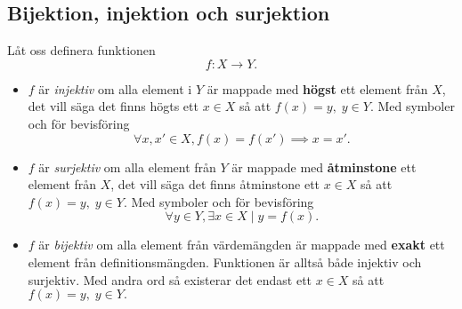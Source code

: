 \documentclass{article}
\theoremstyle{definition}
\begin{document}
\subsection{Bijektion, injektion och surjektion}
\begin{mydef}{}{}
  Låt oss definera funktionen
  \[f: X \rightarrow Y.\]
  \begin{itemize}
    \item $f$ är \textit{injektiv} om alla element i $Y$ är mappade med \textbf{högst}
    ett element från $X$, det vill säga det finns högts ett $x \in X$ så att $f(x) = y, \; y \in Y.$
    Med symboler och för bevisföring
    \[\forall x, x' \in X, f(x) = f(x') \implies x = x'.\]
    \item $f$ är \textit{surjektiv} om alla element från 
    $Y$ är mappade med \textbf{åtminstone} ett element från $X$, det 
    vill säga det finns åtminstone ett $x \in X$ så att $f(x) = y, \; y \in Y.$
    Med symboler och för bevisföring
    \[\forall y \in Y, \exists x \in X \; | \; y = f(x).\]
    \item $f$ är \textit{bijektiv} om alla element från värdemängden är mappade med \textbf{exakt} 
    ett element från definitionsmängden. Funktionen är alltså både injektiv och surjektiv.
    Med andra ord så existerar det endast ett $x \in X$ så att $f(x) = y, \; y \in Y.$
  \end{itemize}
\end{mydef}
\end{document}
